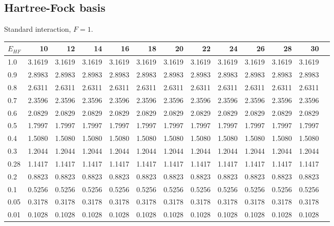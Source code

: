 \FloatBarrier
\subsection{Hartree-Fock basis}
\FloatBarrier
\begin{landscape}
\begin{table}
\begin{center}
Standard interaction, $F=1$.\\
\begin{tabular}{l|rrrrrrrrrrrr}
\hline 
$E_{HF}$ & 10 & 12 & 14 & 16 & 18 & 20 & 22 & 24 & 26 & 28 & 30 \\
\hline \hline
1.0 & 3.1619 & 3.1619 & 3.1619 & 3.1619 & 3.1619 & 3.1619 & 3.1619 & 3.1619 & 3.1619 & 3.1619 & 3.1619  \\ 
0.9 & 2.8983 & 2.8983 & 2.8983 & 2.8983 & 2.8983 & 2.8983 & 2.8983 & 2.8983 & 2.8983 & 2.8983 & 2.8983  \\ 
0.8 & 2.6311 & 2.6311 & 2.6311 & 2.6311 & 2.6311 & 2.6311 & 2.6311 & 2.6311 & 2.6311 & 2.6311 & 2.6311  \\ 
0.7 & 2.3596 & 2.3596 & 2.3596 & 2.3596 & 2.3596 & 2.3596 & 2.3596 & 2.3596 & 2.3596 & 2.3596 & 2.3596  \\ 
0.6 & 2.0829 & 2.0829 & 2.0829 & 2.0829 & 2.0829 & 2.0829 & 2.0829 & 2.0829 & 2.0829 & 2.0829 & 2.0829  \\ 
0.5 & 1.7997 & 1.7997 & 1.7997 & 1.7997 & 1.7997 & 1.7997 & 1.7997 & 1.7997 & 1.7997 & 1.7997 & 1.7997  \\ 
0.4 & 1.5080 & 1.5080 & 1.5080 & 1.5080 & 1.5080 & 1.5080 & 1.5080 & 1.5080 & 1.5080 & 1.5080 & 1.5080  \\ 
0.3 & 1.2044 & 1.2044 & 1.2044 & 1.2044 & 1.2044 & 1.2044 & 1.2044 & 1.2044 & 1.2044 & 1.2044 & 1.2044  \\ 
0.28 & 1.1417 & 1.1417 & 1.1417 & 1.1417 & 1.1417 & 1.1417 & 1.1417 & 1.1417 & 1.1417 & 1.1417 & 1.1417  \\ 
0.2 & 0.8823 & 0.8823 & 0.8823 & 0.8823 & 0.8823 & 0.8823 & 0.8823 & 0.8823 & 0.8823 & 0.8823 & 0.8823  \\ 
0.1 & 0.5256 & 0.5256 & 0.5256 & 0.5256 & 0.5256 & 0.5256 & 0.5256 & 0.5256 & 0.5256 & 0.5256 & 0.5256  \\ 
0.05 & 0.3178 & 0.3178 & 0.3178 & 0.3178 & 0.3178 & 0.3178 & 0.3178 & 0.3178 & 0.3178 & 0.3178 & 0.3178  \\ 
0.01 & 0.1028 & 0.1028 & 0.1028 & 0.1028 & 0.1028 & 0.1028 & 0.1028 & 0.1028 & 0.1028 & 0.1028 & 0.1028  \\ 
\hline \hline

\end{tabular}
\end{center}
\end{table}
\end{landscape}
